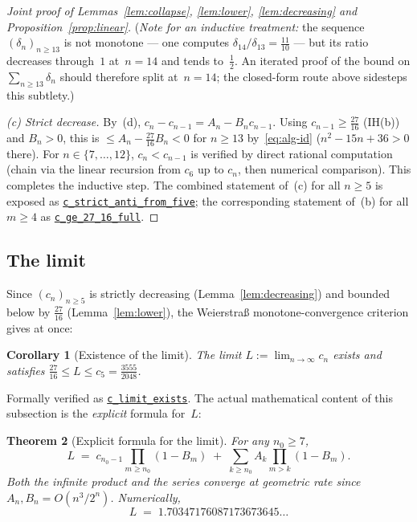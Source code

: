 \documentclass[reqno,final,11pt]{amsart}
\theoremstyle{plain}
\newtheorem{theorem}{Theorem}[section]
\newtheorem{corollary}[theorem]{Corollary}
\theoremstyle{definition}
\theoremstyle{remark}
\begin{document}
\begin{proof}[Joint proof of Lemmas~\ref{lem:collapse},
  \ref{lem:lower}, \ref{lem:decreasing} and Proposition~\ref{prop:linear}]
  (\emph{Note for an inductive treatment:} the sequence
  $(\delta_n)_{n\ge 13}$ is not monotone — one computes
  $\delta_{14}/\delta_{13}=\tfrac{11}{10}$ — but its ratio
  decreases through~$1$ at~$n=14$ and tends to~$\tfrac12$.  An
  iterated proof of the bound on $\sum_{n\ge 13}\delta_n$ should
  therefore split at~$n=14$; the closed-form route above sidesteps
  this subtlety.)

  \emph{(c) Strict decrease.}  By~(d), $c_n-c_{n-1}=A_n-B_nc_{n-1}$.
  Using $c_{n-1}\ge\tfrac{27}{16}$ (IH(b)) and $B_n>0$, this is
  $\le A_n-\tfrac{27}{16}B_n<0$ for $n\ge 13$ by~\eqref{eq:alg-id}
  ($n^2-15n+36>0$ there).  For $n\in\{7,\dots,12\}$, $c_n<c_{n-1}$
  is verified by direct rational computation (chain via the linear
  recursion from $c_6$ up to $c_n$, then numerical comparison).
  This completes the inductive step.  The combined statement of~(c)
  for all $n\ge 5$ is exposed as
  \href{https://github.com/pfaffelh/coins/blob/c60bcd3/CoinsLean/CoinsLean/Perturbation.lean\#L1488}{\texttt{c\_strict\_anti\_from\_five}};
  the corresponding statement of~(b) for all $m\ge 4$ as
  \href{https://github.com/pfaffelh/coins/blob/c60bcd3/CoinsLean/CoinsLean/Perturbation.lean\#L1483}{\texttt{c\_ge\_27\_16\_full}}.
\end{proof}

\subsection{The limit}

Since $(c_n)_{n\ge 5}$ is strictly decreasing
(Lemma~\ref{lem:decreasing}) and bounded below by $\tfrac{27}{16}$
(Lemma~\ref{lem:lower}), the Weierstra\ss{} monotone-convergence
criterion gives at once:

\begin{corollary}[Existence of the limit]\label{cor:L-exists}
  The limit $L:=\lim_{n\to\infty}c_n$ exists and satisfies
  $\tfrac{27}{16}\le L\le c_5=\tfrac{3555}{2048}$.
\end{corollary}

\noindent
Formally verified as
\href{https://github.com/pfaffelh/coins/blob/c60bcd3/CoinsLean/CoinsLean/Perturbation.lean\#L1517}{\texttt{c\_limit\_exists}}.
The actual mathematical content of this subsection is the
\emph{explicit} formula for~$L$:

\begin{theorem}[Explicit formula for the limit]\label{thm:limit}
  For any $n_0\ge 7$,
  \begin{equation}\label{eq:L-formula}
    L \;=\; c_{n_0-1}\prod_{m\ge n_0}(1-B_m)
    \;+\; \sum_{k\ge n_0}A_k\prod_{m>k}(1-B_m).
  \end{equation}
  Both the infinite product and the series converge at geometric
  rate since $A_n,B_n=O(n^3/2^n)$.  Numerically,
  \begin{equation}\label{eq:L-value}
    L \;=\; 1.70347176087173673645\ldots
  \end{equation}
\end{theorem}
\end{document}
